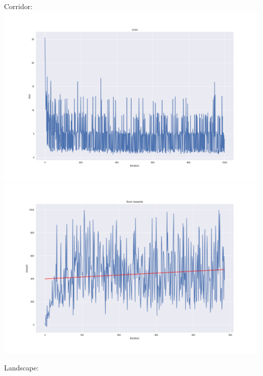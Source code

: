 \documentclass{article}
\begin{document}
Corridor:
\includegraphics[scale=0.2]{plots/corridor_loss.png}
\includegraphics[scale=0.2]{plots/corridor_rewards.png}

Landscape:
\end{document}
